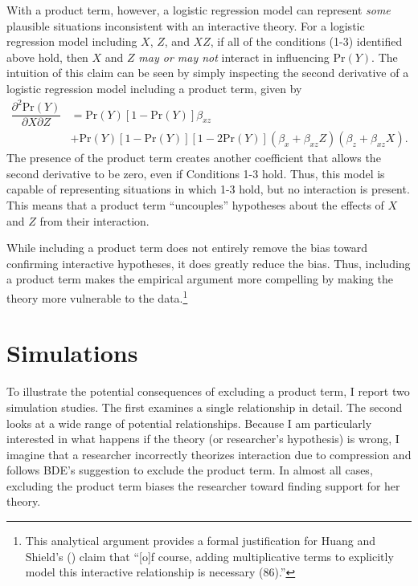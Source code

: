 \documentclass[12pt]{article}
\begin{document}
With a product term, however, a logistic regression model can represent \textit{some} plausible situations inconsistent with an interactive theory. For a logistic regression model including $X$, $Z$, and $XZ$, if all of the conditions (1-3) identified above hold, then $X$ and $Z$ \textit{may or may not} interact in influencing Pr$(Y)$. The intuition of this claim can be seen by simply inspecting the second derivative of a logistic regression model including a product term, given by
\begin{equation}
\begin{aligned}
\dfrac{\partial^2 \text{Pr}(Y)}{\partial X \partial Z} &= \text{Pr}(Y)[1 - \text{Pr}(Y)]\beta_{xz} \\
&+ \text{Pr}(Y)[1 - \text{Pr}(Y)][1 - 2\text{Pr}(Y)](\beta_x + \beta_{xz}Z )(\beta_z + \beta_{xz}X)\label{eqn:dprod}. 
\end{aligned}
\end{equation}
The presence of the product term creates another coefficient that allows the second derivative to be zero, even if Conditions 1-3 hold. Thus, this model is capable of representing situations in which 1-3 hold, but no interaction is present. This means that a product term ``uncouples'' hypotheses about  the effects of $X$ and $Z$ from their interaction.

While including a product term does not entirely remove the bias toward confirming interactive hypotheses, it does greatly reduce the bias. Thus, including a product term makes the empirical argument more compelling by making the theory more vulnerable to the data.\footnote{This analytical argument provides a formal justification for Huang and Shield's (\citeyear{HuangShields2000}) claim that ``[o]f course, adding multiplicative terms to explicitly model this interactive relationship is necessary (86).''}

\section*{Simulations}

To illustrate the potential consequences of excluding a product term, I report two simulation studies. The first examines a single relationship in detail. The second looks at a wide range of potential relationships. Because I am particularly interested in what happens if the theory (or researcher's hypothesis) is wrong, I imagine that a researcher incorrectly theorizes interaction due to compression and follows BDE's suggestion to exclude the product term. In almost all cases, excluding the product term biases the researcher toward finding support for her theory.
\end{document}
